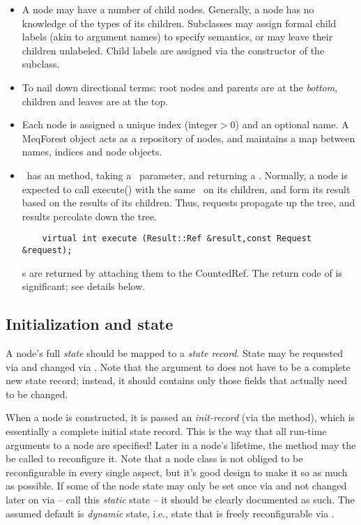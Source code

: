 \documentclass[10pt]{article}
\begin{document}
  \begin{itemize}

  \item A node may have a number of child nodes. Generally, a node has no
    knowledge of the types of its children. Subclasses may assign formal child
    labels (akin to argument names) to specify semantics, or may leave their
    children unlabeled. Child labels are assigned via the constructor of the
    subclass.

  \item To nail down directional terms: root nodes and parents are at the {\em
    bottom}, children and leaves are at the top. 

  \item Each node is assigned a unique index (integer$>$0) and an optional name. A
    MeqForest object acts as a repository of nodes, and maintains a map between
    names, indices and node objects.

  \item \Node\ has an  method, taking a \Request\ parameter,
    and returning a \Result. Normally, a node is expected to call execute()
    with the same \Request\ on its children, and form its result based on the
    results of its children. Thus, requests propagate up the tree, and results
    percolate down the tree.

\begin{verbatim}
    virtual int execute (Result::Ref &result,const Request &request);
\end{verbatim}

    \Result{}s are returned by attaching them to the CountedRef. The return code
    of  is significant; see details below.

  \end{itemize}

\subsection{Initialization and state}
  
  A node's full {\em state} should be mapped to a {\em state record}. State may
  be requested via  and changed via . Note that
  the argument to  does not have to be a complete new state
  record; instead, it should contains only those fields that actually need to
  be changed. 

  When a node is constructed, it is passed an {\em init-record} (via the
   method), which is essentially a complete initial state record.
  This is the way that all run-time arguments to a node are specified! Later 
  in a node's lifetime, the  method may the be called to
  reconfigure  it. Note that a node class is not obliged to be reconfigurable
  in every single aspect, but it's good design to make it so as much as
  possible. If some of the node state may only be set once via  and
  not changed later on via  -- call this {\em static\/} state --
  it should be clearly documented as such. The assumed default is {\em
  dynamic\/} state, i.e., state that is freely reconfigurable via
  .
\end{document}
